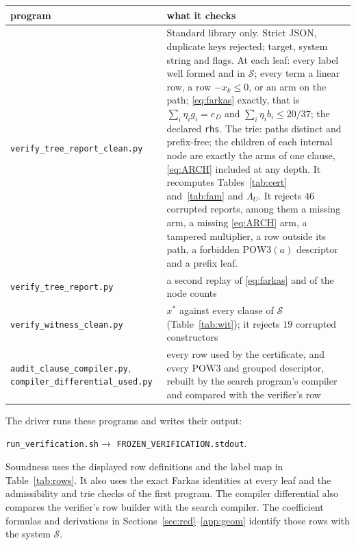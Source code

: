 \documentclass{amsart}
\theoremstyle{definition}
\theoremstyle{plain}
\numberwithin{equation}{section}
\numberwithin{table}{section}
\newcommand{\certMut}{46}
\newcommand{\certWitMut}{19}
\begin{document}
\begin{center}\small
\begin{tabular}{@{}>{\raggedright\arraybackslash}p{}>{\raggedright\arraybackslash}p{}@{}}
\hline program & what it checks\\\hline
\texttt{verify\_tree\_}\penalty0\texttt{report\_clean.py} &
 Standard library only. Strict JSON, duplicate keys rejected; target, system
 string and flags. At each leaf: every label well formed and in
 $\mathcal S$; every term a linear row, a row $-x_k\le0$, or an arm on the
 path; \eqref{eq:farkas} exactly, that is $\sum_i\eta_i g_i=e_D$ and
 $\sum_i\eta_i b_i\le20/37$; the declared \texttt{rhs}. The trie: paths
 distinct and prefix-free; the children of each internal node are exactly
 the arms of one clause, \eqref{eq:ARCH} included at any depth. It
 recomputes Tables~\ref{tab:cert} and~\ref{tab:fam} and $\Lambda_U$. It
 rejects $\certMut$ corrupted reports, among them a missing arm, a missing
 \eqref{eq:ARCH} arm, a tampered multiplier, a row outside its path, a
 forbidden $\mathrm{POW3}(a)$ descriptor and a prefix leaf.\\
\texttt{verify\_tree\_}\penalty0\texttt{report.py} &
 a second replay of \eqref{eq:farkas} and of the node counts\\
\texttt{verify\_witness\_}\penalty0\texttt{clean.py} &
 $x^*$ against every clause of $\mathcal S$ (Table~\ref{tab:wit}); it
 rejects $\certWitMut$ corrupted constructors\\
\texttt{audit\_clause\_}\penalty0\texttt{compiler.py},
\texttt{compiler\_}\penalty0\texttt{differential\_used.py} &
 every row used by the certificate, and every $\mathrm{POW3}$ and grouped
 descriptor, rebuilt by the search program's compiler and compared with the
 verifier's row\\
\hline
\end{tabular}
\end{center}

The driver runs these programs and writes their output:
\begin{center}\small
\texttt{run\_verification.sh}\quad$\longrightarrow$\quad
\texttt{FROZEN\_VERIFICATION.stdout}.
\end{center}
Soundness uses the displayed row definitions and the label map in
Table~\ref{tab:rows}. It also uses the exact Farkas identities at every leaf
and the admissibility and trie checks of the first program. The compiler
differential also compares the verifier's row builder with the search
compiler. The coefficient formulas and derivations in
Sections~\ref{sec:red}--\ref{app:geom} identify those rows with the system
$\mathcal S$.
\end{document}
